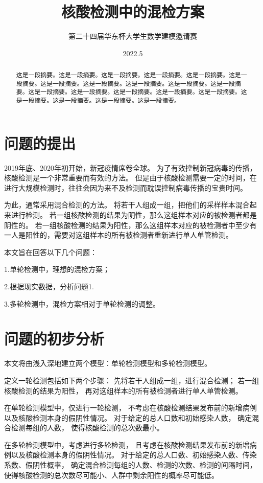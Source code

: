 \documentclass[12pt]{article}
\title{核酸检测中的混检方案}
\author{第二十四届华东杯大学生数学建模邀请赛}
\date{2022.5}
\begin{document}
\maketitle

\begin{abstract}
这是一段摘要。这是一段摘要。这是一段摘要。这是一段摘要。这是一段摘要。这是一段摘要。这是一段摘要。这是一段摘要。这是一段摘要。这是一段摘要。这是一段摘要。这是一段摘要。这是一段摘要。这是一段摘要。这是一段摘要。这是一段摘要。这是一段摘要。这是一段摘要。这是一段摘要。这是一段摘要。
\end{abstract}

\newpage
\tableofcontents
\newpage

{\centering\section{问题的提出}}

2019年底、2020年初开始，新冠疫情席卷全球。
为了有效控制新冠病毒的传播，核酸检测是一个非常重要而有效的方法。
但是由于核酸检测需要一定的时间，在进行大规模检测时，往往会因为来不及检测而耽误控制病毒传播的宝贵时间。

为此，通常采用混合检测的方法。
将若干人组成一组，把他们的采样样本混合起来进行检测。
若一组核酸检测的结果为阴性，那么这组样本对应的被检测者都是阴性的。
若一组核酸检测的结果为阳性，那么这组样本对应的被检测者中至少有一人是阳性的，需要对这组样本的所有被检测者重新进行单人单管检测。

本文旨在回答以下几个问题：

1.单轮检测中，理想的混检方案；

2.根据现实数据，分析问题1.

3.多轮检测中，混检方案相对于单轮检测的调整。

{\centering\section{问题的初步分析}}

本文将由浅入深地建立两个模型：单轮检测模型和多轮检测模型。

定义一轮检测包括如下两个步骤：
先将若干人组成一组，进行混合检测；
若一组核酸检测的结果为阳性，
再对这组样本的所有被检测者进行单人单管检测。

在单轮检测模型中，仅进行一轮检测，
不考虑在核酸检测结果发布前的新增病例以及核酸检测本身的假阴性情况。
对于给定的总人口数和初始感染人数，
确定混合检测每组的人数，
使得核酸检测的总次数最小。

在多轮检测模型中，考虑进行多轮检测，
且考虑在核酸检测结果发布前的新增病例以及核酸检测本身的假阴性情况。
对于给定的总人口数、初始感染人数、传染系数、假阴性概率，
确定混合检测每组的人数、检测的次数、检测的间隔时间，
使得核酸检测的总次数尽可能小、人群中剩余阳性的概率尽可能低。
\end{document}
